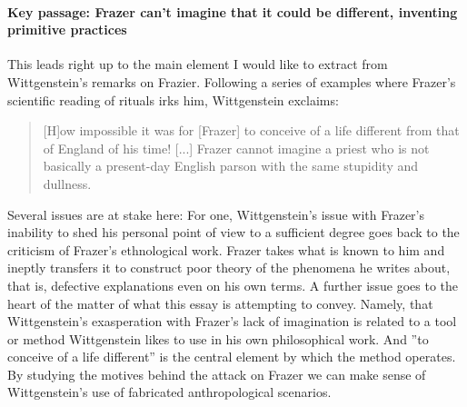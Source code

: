 \documentclass{article}
\begin{document}
\paragraph{Key passage: Frazer can't imagine that it could be different, inventing primitive practices}
This leads right up to the main element I would like to extract from Wittgenstein's remarks on Frazier. Following a series of examples where Frazer's scientific reading of rituals irks him, Wittgenstein exclaims:
\begin{quote}
[H]ow impossible it was for [Frazer] to conceive of a life different from that of England of his time! [...] Frazer cannot imagine a priest who is not basically a present-day English parson with the same stupidity and dullness.
\end{quote}
Several issues are at stake here: For one, Wittgenstein's issue with Frazer's inability to shed his personal point of view to a sufficient degree goes back to the criticism of Frazer's ethnological work. Frazer takes what is known to him and ineptly transfers it to construct poor theory of the phenomena he writes about, that is, defective explanations even on his own terms. A further issue goes to the heart of the matter of what this essay is attempting to convey. Namely, that Wittgenstein's exasperation with Frazer's lack of imagination is related to a tool or method Wittgenstein likes to use in his own philosophical work. And ''to conceive of a life different'' is the central element by which the method operates. By studying the motives behind the attack on Frazer we can make sense of Wittgenstein's use of fabricated anthropological scenarios. 
 
\end{document}
